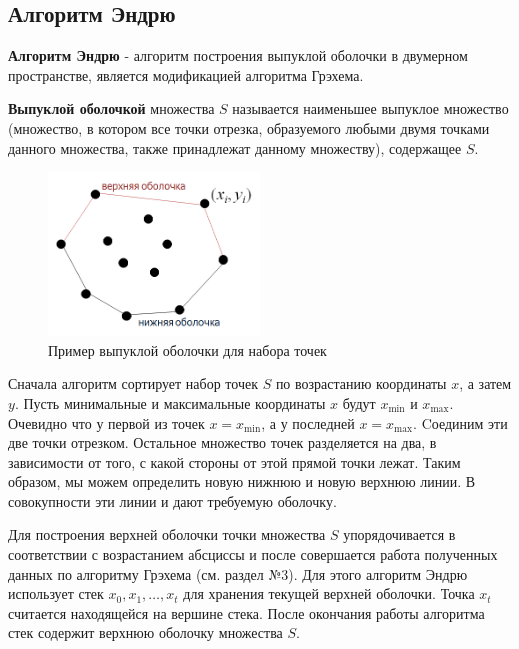 \documentclass[a4paper,12pt]{article}
\begin{document}
\newpage 
\subsection{Алгоритм Эндрю} 
\textbf{Алгоритм Эндрю} - алгоритм построения выпуклой оболочки в двумерном пространстве, является модификацией алгоритма Грэхема. 

\textbf{Выпуклой оболочкой} множества $S$ называется наименьшее выпуклое множество (множество, в котором все точки отрезка, образуемого любыми двумя точками данного множества, также принадлежат данному множеству), содержащее $S$.

\begin{figure}[H]
\vspace{-0.5em}
\captionsetup{justification=centering, skip=-0.5em}
  \centering
  \includegraphics[width=0.5\textwidth]{images/convex_hull.png}
  \caption{Пример выпуклой оболочки для набора точек}
\vspace{-1em}
\end{figure}

Сначала алгоритм сортирует набор точек $S$ по возрастанию координаты $x$, а затем $y$. Пусть минимальные и максимальные координаты $x$ будут $x_{\min}$ и $x_{\max}$. Очевидно что у первой из точек $x=x_{\min}$, а у последней $x=x_{\max}$. Cоединим эти две точки отрезком. Остальное множество точек разделяется на два, в зависимости от того, с какой стороны от этой прямой точки лежат. Таким образом, мы можем определить новую нижнюю и новую верхнюю линии. В совокупности эти линии и дают требуемую оболочку.

Для построения верхней оболочки точки множества $S$ упорядочивается в соответствии с возрастанием абсциссы и после совершается работа полученных данных по алгоритму Грэхема (см. раздел №3). Для этого алгоритм Эндрю использует стек $x_0, x_1, \dots, x_t$ для хранения текущей верхней оболочки. Точка $x_t$ считается находящейся на вершине стека. После окончания работы алгоритма стек содержит верхнюю оболочку множества $S$.
\end{document}
